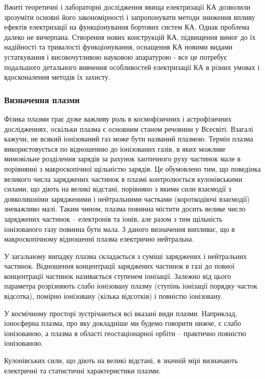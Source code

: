\documentclass[a4paper,12pt]{article}
\begin{document}
Вжиті теоретичні і лабораторні дослідження явища електризації КА дозволили зрозуміти основні його закономірності і запропонувати методи зниження впливу ефектів електризації на функціонування бортових систем КА. Однак проблема далеко не вичерпана. Створення нових конструкцій КА, підвищення вимог до їх надійності та тривалості функціонування, оснащення КА новими видами устаткування і високочутливою науковою апаратурою - все це потребує подальшого детального вивчення особливостей електризації КА в різних умовах і вдосконалення методів їх захисту.\cite{novikov}

\subsubsection{Визначення плазми}
Фізика плазми грає дуже важливу роль в космофізичних і астрофізичних дослідженнях, оскільки плазма є основним станом речовини у Всесвіті. Взагалі кажучи, не всякий іонізований газ може бути названий плазмою. Термін плазма використовується по відношенню до іонізованих газів, в яких можливе мимовільне розділення зарядів за рахунок хаотичного руху частинок мале в порівнянні з макроскопічної щільністю зарядів. Це обумовлено тим, що поведінка великого числа заряджених частинок в плазмі контролюється кулонівськими силами, що діють на великі відстані, порівняно з якими сили взаємодії з довколишніми зарядженими і нейтральними частками (короткодіючі взаємодії) зневажливо малі. Таким чином, плазма повинна містити досить велике число заряджених частинок -- електронів та іонів, але разом з тим щільність іонізованого газу повинна бути мала. З даного визначення випливає, що в макроскопічному відношенні плазма електрично нейтральна.

У загальному випадку плазма складається з суміші заряджених і нейтральних частинок. Відношення концентрації заряджених частинок в газі до повної концентрації частинок називається ступенем іонізації. Залежно від цього параметра розрізняють слабо іонізовану плазму (ступінь іонізації порядку часток відсотка), помірно іонізовану (кілька відсотків) і повністю іонізовану.

У космічному просторі зустрічаються всі вказані види плазми. Наприклад, іоносферна плазма, про яку докладніше ми будемо говорити нижче, є слабо іонізованою, а плазма в області геостаціонарної орбіти -- практично повністю іонізованою.

Кулонівських сили, що діють на великі відстані, в значній мірі визначають електричні та статистичні характеристики плазми.\cite{novikov}
\end{document}
